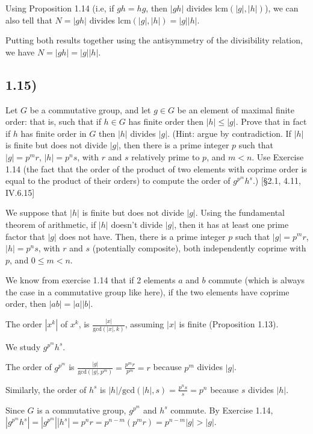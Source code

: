 \documentclass[12pt, letterpaper, twoside]{report}
\begin{document}
Using Proposition 1.14 (i.e, if $gh = hg$, then $|gh|$ divides $\text{lcm}(|g|, |h|)$), we can also tell that $N = |gh|$ divides $\text{lcm}(|g|, |h|) = |g| |h|$.

Putting both results together using the antisymmetry of the divisibility relation, we have $N = |gh| = |g||h|$.



\subsection*{1.15)}

Let $G$ be a commutative group, and let $g \in G$ be an element of maximal finite order: that is, such that if $h \in G$ has finite order then $|h| \leq |g|$. Prove that in fact if $h$ has finite order in $G$ then $|h|$ divides $|g|$. (Hint: argue by contradiction. If $|h|$ is finite but does not divide $|g|$, then there is a prime integer $p$ such that $|g| = p^m r$, $|h| = p^n s$, with $r$ and $s$ relatively prime to $p$, and $m < n$. Use Exercise 1.14 (the fact that the order of the product of two elements with coprime order is equal to the product of their orders) to compute the order of $g^{p^m} h^s$.) [§2.1, 4.11, IV.6.15]

We suppose that $|h|$ is finite but does not divide $|g|$. Using the fundamental theorem of arithmetic, if $|h|$ doesn't divide $|g|$, then it has at least one prime factor that $|g|$ does not have. Then, there is a prime integer $p$ such that $|g| = p^m r$, $|h| = p^n s$, with $r$ and $s$ (potentially composite), both independently coprime with $p$, and $0 \leq m < n$.

We know from exercise 1.14 that if 2 elements $a$ and $b$ commute (which is always the case in a commutative group like here), if the two elements have coprime order, then $|ab| = |a||b|$.

The order $|x^k|$ of $x^k$, is $\frac{|x|}{\text{gcd}(|x|, k)}$, assuming $|x|$ is finite (Proposition 1.13).

We study $g^{p^m} h^s$. 

The order of $g^{p^m}$ is $\frac{|g|}{\text{gcd}(|g|, p^m)} = \frac{p^m r}{p^m} = r$ because $p^m$ divides $|g|$.

Similarly, the order of $h^s$ is $|h|/\text{gcd}(|h|, s) = \frac{p^n s}{s} = p^n$ because $s$ divides $|h|$.

Since $G$ is a commutative group, $g^{p^m}$ and $h^s$ commute. By Exercise 1.14, $|g^{p^m} h^s| = |g^{p^m}| |h^s| = p^n r = p^{n-m} (p^m r) = p^{n-m} |g| > |g|$.
\end{document}
